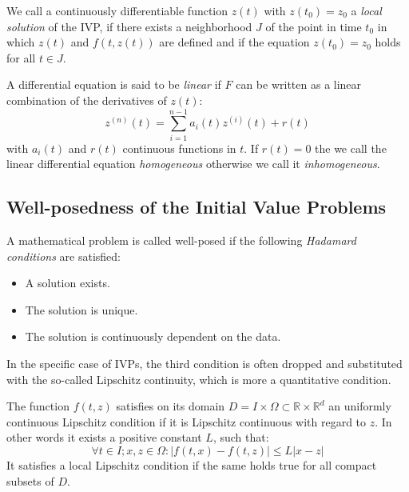 \begin{definition}
	We call a continuously differentiable function $z(t)$ with $z(t_0) = z_0$ a \textit{local solution} of the IVP, if there exists a	neighborhood $J$ of the point in time $t_0$ in which $z(t)$ and $f(t,z(t))$ are defined and if the equation $z(t_0) = z_0$ holds for all $t \in J$.
\end{definition}

\begin{definition}
	A differential equation is said to be \textit{linear} if $F$ can be written as a linear combination of the derivatives of $z(t)$:
	\begin{equation}
		z^{(n)}(t) = \sum_{i=1}^{n-1} a_i(t)z^{(i)}(t)+r(t)
	\end{equation}
	with $a_i(t)$ and $r(t)$ continuous functions in $t$. If $r(t)=0$ the we call the linear differential equation \textit{homogeneous} otherwise we call it \textit{inhomogeneous}.
\end{definition}

\subsection{Well-posedness of the Initial Value Problems}

\begin{definition}
	A mathematical problem is called well-posed if the following \textit{Hadamard conditions} are satisfied:
	\begin{itemize}
		\setlength{\itemsep}{0pt}
		\item A solution exists.
		\item The solution is unique.
		\item The solution is continuously dependent on the data.
	\end{itemize}
\end{definition}

In the specific case of IVPs, the third condition is often dropped and substituted with the so-called Lipschitz continuity, which is more a quantitative condition.

\begin{definition}
	The function $f(t,z)$ satisfies on its domain $D = I \times \Omega \subset \mathbb{R} \times \mathbb{R}^d$ an uniformly continuous Lipschitz condition if it is Lipschitz continuous with regard to $z$. In other words it exists a positive constant $L$, such that:
	\begin{equation}
		\forall t\in I; x,z \in \Omega : |f(t,x) - f(t,z)| \leq L |x-z|
	\end{equation}
	It satisfies a local Lipschitz condition if the same holds true for all compact subsets of $D$.
\end{definition}

